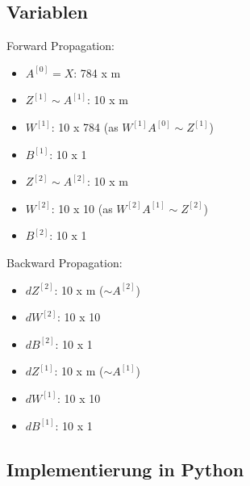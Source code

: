 \documentclass[10pt,a4paper]{article}
\newlength{\sectionparaspace}
\begin{document}
\subsection*{Variablen}
Forward Propagation:
\begin{itemize}
  \item $A^{[0]} = X$: 784 x m
  \item $Z^{[1]} \sim A^{[1]}$: 10 x m
  \item $W^{[1]}$: 10 x 784 (as $W^{[1]} A^{[0]} \sim Z^{[1]}$)
  \item $B^{[1]}$: 10 x 1
  \item $Z^{[2]} \sim A^{[2]}$: 10 x m
  \item $W^{[2]}$: 10 x 10 (as $W^{[2]} A^{[1]} \sim Z^{[2]}$)
  \item $B^{[2]}$: 10 x 1
\end{itemize}

Backward Propagation:
\begin{itemize}
  \item $dZ^{[2]}$: 10 x m ($\sim A^{[2]}$)
  \item $dW^{[2]}$: 10 x 10
  \item $dB^{[2]}$: 10 x 1
  \item $dZ^{[1]}$: 10 x m ($\sim A^{[1]}$)
  \item $dW^{[1]}$: 10 x 10
  \item $dB^{[1]}$: 10 x 1
\end{itemize}


\subsection*{Implementierung in Python}

\vspace{-\sectionparaspace}
\end{document}
